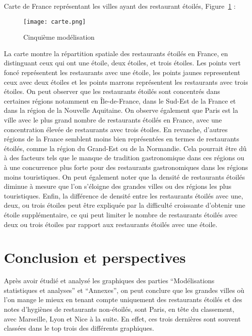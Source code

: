 \documentclass[mstat,12pt]{unswthesis}
\begin{document}
\bigskip

Carte de France représentant les villes ayant des restaurant étoilés,
Figure \(~\)\ref{diag5} :

\begin{figure}
\hypertarget{diag5}{%
\centering
\texttt{[image: carte.png]}
\caption{Cinquième modélisation}\label{diag5}
}
\end{figure}

\medskip

La carte montre la répartition spatiale des restaurants étoilés en
France, en distinguant ceux qui ont une étoile, deux étoiles, et trois
étoiles. Les points vert foncé représentent les restaurants avec une
étoile, les points jaunes representent ceux avec deux étoiles et les
points marrons représentent les restaurants avec trois étoiles. On peut
observer que les restaurants étoilés sont concentrés dans certaines
régions notamment en Île-de-France, dans le Sud-Est de la France et dans
la région de la Nouvelle Aquitaine. On observe également que Paris est
la ville avec le plus grand nombre de restaurants étoilés en France,
avec une concentration élevée de restaurants avec trois étoiles. En
revanche, d'autres régions de la France semblent moins bien représentées
en termes de restaurants étoilés, comme la région du Grand-Est ou de la
Normandie. Cela pourrait être dû à des facteurs tels que le manque de
tradition gastronomique dans ces régions ou à une concurrence plus forte
pour des restaurants gastronomiques dans les régions moins touristiques.
On peut également noter que la densité de restaurants étoilés diminue à
mesure que l'on s'éloigne des grandes villes ou des régions les plus
touristiques. Enfin, la différence de densité entre les restaurants
étoilés avec une, deux, ou trois étoiles peut être expliquée par la
difficulté croissante d'obtenir une étoile supplémentaire, ce qui peut
limiter le nombre de restaurants étoilés avec deux ou trois étoiles par
rapport aux restaurants étoilés avec une étoile.

\bigskip

\hypertarget{conclusion-et-perspectives}{%
\chapter{Conclusion et perspectives}\label{conclusion-et-perspectives}}

Après avoir étudié et analysé les graphiques des parties ``Modélisations
statistiques et analyses'' et ``Annexes'', on peut conclure que les
grandes villes où l'on mange le mieux en tenant compte uniquement des
restaurants étoilés et des notes d'hygiènes de restaurants non-étoilés,
sont Paris, en tête du classement, avec Marseille, Lyon et Nice à la
suite. En effet, ces trois dernières sont souvent classées dans le top
trois des différents graphiques.
\end{document}
